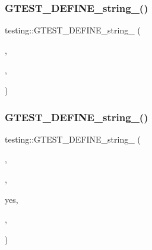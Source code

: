 \mbox{\label{namespacetesting_a62d8ec1eb3e20f20ed52604b0dfa3425}} 
\subsubsection{\texorpdfstring{GTEST\_DEFINE\_string\_()}{GTEST\_DEFINE\_string\_()}\hspace{0.1cm}{\footnotesize\ttfamily [1/5]}}
{\footnotesize\ttfamily testing\+::\+G\+T\+E\+S\+T\+\_\+\+D\+E\+F\+I\+N\+E\+\_\+string\+\_\+ (\begin{DoxyParamCaption}\item[{death\+\_\+test\+\_\+style}]{,  }\item[{\mbox{\hyperlink{namespacetesting_1_1internal_a7ed785df46a339403b0f749d3a879201}{internal\+::\+String\+From\+G\+Test\+Env}}(\char`\"{}death\+\_\+test\+\_\+style\char`\"{}, k\+Default\+Death\+Test\+Style)}]{,  }\item[{\char`\"{}Indicates how to run a death test in a forked child process\+: \char`\"{} \char`\"{}\textbackslash{}\char`\"{}threadsafe\textbackslash{}\char`\"{} (child process re-\/executes the test binary \char`\"{} \char`\"{}from the beginning, running only the specific death test) or \char`\"{} \char`\"{}\textbackslash{}\char`\"{}fast\textbackslash{}\char`\"{} (child process runs the death test immediately \char`\"{} \char`\"{}after forking).\char`\"{}}]{ }\end{DoxyParamCaption})}

\mbox{\label{namespacetesting_a32f0280e95e7718835b0e3d2f7277269}} 
\subsubsection{\texorpdfstring{GTEST\_DEFINE\_string\_()}{GTEST\_DEFINE\_string\_()}\hspace{0.1cm}{\footnotesize\ttfamily [2/5]}}
{\footnotesize\ttfamily testing\+::\+G\+T\+E\+S\+T\+\_\+\+D\+E\+F\+I\+N\+E\+\_\+string\+\_\+ (\begin{DoxyParamCaption}\item[{color}]{,  }\item[{\mbox{\hyperlink{namespacetesting_1_1internal_a7ed785df46a339403b0f749d3a879201}{internal\+::\+String\+From\+G\+Test\+Env}}(\char`\"{}color\char`\"{}, \char`\"{}auto\char`\"{})}]{,  }\item[{\char`\"{}Whether to use colors in the output. Valid values\+:}]{yes,  }\item[{no}]{,  }\item[{\char`\"{} \char`\"{}and auto. \textquotesingle{}auto\textquotesingle{} means to use colors if the output is \char`\"{} \char`\"{}being sent to a terminal and the T\+E\+RM environment variable \char`\"{} \char`\"{}is set to a terminal type that supports colors.\char`\"{}}]{ }\end{DoxyParamCaption})}

